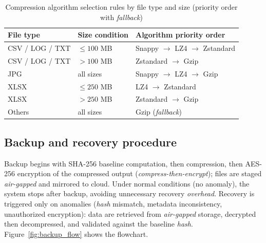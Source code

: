 \documentclass{iaesarticle}
\begin{document}
\begin{table}[H]
\centering
\fontsize{8pt}{10pt}\selectfont
\caption{Compression algorithm selection rules by file type and size (priority order with \textit{fallback})}
\label{tab:rule_selection}
\begin{tabular}{l l l}
\hline
\textbf{File type} & \textbf{Size condition} & \textbf{Algorithm priority order} \\
\hline
CSV / LOG / TXT & $\leq 100$ MB & Snappy $\rightarrow$ LZ4 $\rightarrow$ Zstandard \\
CSV / LOG / TXT & $> 100$ MB & Zstandard $\rightarrow$ Gzip \\
JPG & all sizes & Snappy $\rightarrow$ LZ4 $\rightarrow$ Gzip \\
XLSX & $\leq 250$ MB & LZ4 $\rightarrow$ Zstandard \\
XLSX & $> 250$ MB & Zstandard $\rightarrow$ Gzip \\
Others & all sizes & Gzip (\textit{fallback}) \\
\hline
\end{tabular}
\end{table}

\subsection{Backup and recovery procedure}
Backup begins with SHA-256 baseline computation, then compression, then AES-256 encryption of the compressed output (\textit{compress-then-encrypt}); files are staged \textit{air-gapped} and mirrored to cloud. Under normal conditions (no anomaly), the system stops after backup, avoiding unnecessary recovery \textit{overhead}. Recovery is triggered only on anomalies (\textit{hash} mismatch, metadata inconsistency, unauthorized encryption): data are retrieved from \textit{air-gapped} storage, decrypted then decompressed, and validated against the baseline \textit{hash}. Figure~\ref{fig:backup_flow} shows the flowchart.
\end{document}
